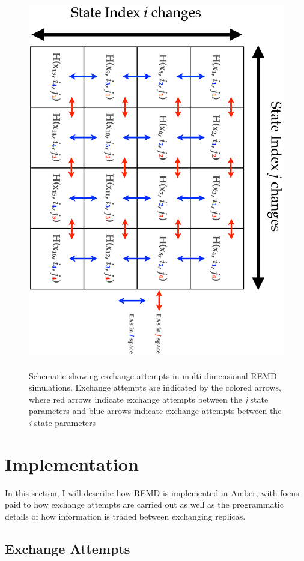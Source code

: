 \begin{figure}
   \includegraphics[height=6.5in, angle=90]{MultiDREMD.ps}
   \caption{Schematic showing exchange attempts in multi-dimensional REMD
            simulations. Exchange attempts are indicated by the colored arrows,
            where red arrows indicate exchange attempts between the \emph{j}
            state parameters and blue arrows indicate exchange attempts between
            the \emph{i} state parameters}
   \label{fig5:MultiDREMD}
\end{figure}

\section{Implementation}

In this section, I will describe how REMD is implemented in Amber, with focus
paid to how exchange attempts are carried out as well as the programmatic
details of how information is traded between exchanging replicas.

\subsection{Exchange Attempts}

